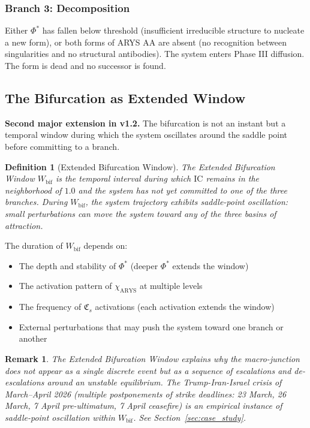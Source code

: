 \documentclass[12pt,a4paper]{article}
\newtheorem{definition}{Definition}[section]
\newtheorem*{remark}{Remark}
\newcommand{\IC}{\mathrm{IC}}
\newcommand{\Phistar}{\Phi^{*}}
\newcommand{\CFs}{\mathfrak{C}_s}        %
\begin{document}
\subsubsection{Branch 3: Decomposition}

Either $\Phistar$ has fallen below threshold (insufficient irreducible structure to nucleate a new form), or both forms of ARYS AA are absent (no recognition between singularities and no structural antibodies). The system enters Phase III diffusion. The form is dead and no successor is found.

\subsection{The Bifurcation as Extended Window}\label{subsec:bif_window}

\textbf{Second major extension in v1.2.} The bifurcation is not an instant but a temporal window during which the system oscillates around the saddle point before committing to a branch.

\begin{definition}[Extended Bifurcation Window]\label{def:bif_window}
The Extended Bifurcation Window $W_{\mathrm{bif}}$ is the temporal interval during which $\IC$ remains in the neighborhood of $1.0$ and the system has not yet committed to one of the three branches. During $W_{\mathrm{bif}}$, the system trajectory exhibits saddle-point oscillation: small perturbations can move the system toward any of the three basins of attraction.
\end{definition}

The duration of $W_{\mathrm{bif}}$ depends on:
\begin{itemize}[leftmargin=2em]
    \item The depth and stability of $\Phistar$ (deeper $\Phistar$ extends the window)
    \item The activation pattern of $\chi_{\mathrm{ARYS}}$ at multiple levels
    \item The frequency of $\CFs$ activations (each activation extends the window)
    \item External perturbations that may push the system toward one branch or another
\end{itemize}

\begin{remark}
The Extended Bifurcation Window explains why the macro-junction does not appear as a single discrete event but as a sequence of escalations and de-escalations around an unstable equilibrium. The Trump-Iran-Israel crisis of March--April 2026 (multiple postponements of strike deadlines: 23 March, 26 March, 7 April pre-ultimatum, 7 April ceasefire) is an empirical instance of saddle-point oscillation within $W_{\mathrm{bif}}$. See Section~\ref{sec:case_study}.
\end{remark}
\end{document}
